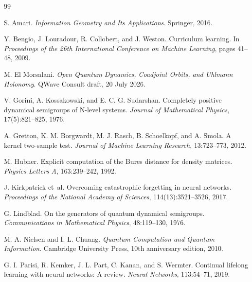 \begin{thebibliography}{99}

S. Amari.
\newblock \emph{Information Geometry and Its Applications}.
\newblock Springer, 2016.

Y. Bengio, J. Louradour, R. Collobert, and J. Weston.
\newblock Curriculum learning.
\newblock In \emph{Proceedings of the 26th International Conference on Machine Learning}, pages 41--48, 2009.

M. El Morsalani.
\newblock \emph{Open Quantum Dynamics, Coadjoint Orbits, and Uhlmann Holonomy}.
\newblock QWave Consult draft, 20 July 2026.

V. Gorini, A. Kossakowski, and E. C. G. Sudarshan.
\newblock Completely positive dynamical semigroups of N-level systems.
\newblock \emph{Journal of Mathematical Physics}, 17(5):821--825, 1976.

A. Gretton, K. M. Borgwardt, M. J. Rasch, B. Schoelkopf, and A. Smola.
\newblock A kernel two-sample test.
\newblock \emph{Journal of Machine Learning Research}, 13:723--773, 2012.

M. Hubner.
\newblock Explicit computation of the Bures distance for density matrices.
\newblock \emph{Physics Letters A}, 163:239--242, 1992.

J. Kirkpatrick et~al.
\newblock Overcoming catastrophic forgetting in neural networks.
\newblock \emph{Proceedings of the National Academy of Sciences}, 114(13):3521--3526, 2017.

G. Lindblad.
\newblock On the generators of quantum dynamical semigroups.
\newblock \emph{Communications in Mathematical Physics}, 48:119--130, 1976.

M. A. Nielsen and I. L. Chuang.
\newblock \emph{Quantum Computation and Quantum Information}.
\newblock Cambridge University Press, 10th anniversary edition, 2010.

G. I. Parisi, R. Kemker, J. L. Part, C. Kanan, and S. Wermter.
\newblock Continual lifelong learning with neural networks: A review.
\newblock \emph{Neural Networks}, 113:54--71, 2019.


\end{thebibliography}
